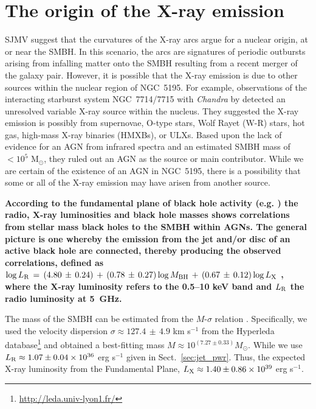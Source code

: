 \documentclass[fleqn,usenatbib]{mnras}
\def\sect{Sect.}
\begin{document}

\section{The origin of the X-ray emission}
\label{sec:xrays_orign}

SJMV suggest that the curvatures of the X-ray arcs argue for a nuclear origin, at or near the SMBH. In this 
scenario, the arcs are signatures of periodic outbursts arising from infalling matter onto the SMBH 
resulting from a recent merger of the galaxy pair. However, it is possible that the X-ray emission is due 
to other sources within the nuclear region of NGC~5195. 
For example, observations of the interacting starburst system NGC~7714/7715 with \textit{Chandra} by 
\cite{SSN2005} detected an unresolved variable X-ray source within the nucleus. They suggested the X-ray 
emission is possibly from supernovae, O-type stars, Wolf Rayet (W-R) stars,
hot gas, high-mass X-ray binaries (HMXBs), or ULXs. Based upon the lack of evidence for an AGN from 
infrared spectra and an estimated SMBH mass of $< 10^{5}$ M$_{\odot}$, they ruled out an AGN as the source 
or main contributor. While we are certain of the existence of an AGN in NGC~5195, there is a possibility 
that some or all of the X-ray emission may have arisen from another source. 

\textbf{According to the fundamental plane of black hole activity (e.g. \citealt{Merloni+2003,Falcke+2004,Kordingetal2006b}) the radio, X-ray luminosities and black hole masses shows correlations from stellar mass black holes to the SMBH within AGNs. The general picture is one whereby the emission from the jet and/or disc of an active black hole are connected, thereby producing the observed correlations, defined as $\log L_{\rm R}\,=\,(4.80\,\pm\,0.24)\,+\,(0.78\,\pm\,0.27)\log M_{\rm BH}\,+\,(0.67\,\pm\,0.12)\log L_{\rm X}$ \citep{Gultekinetal2009}, where the X-ray luminosity refers to the 0.5--10 keV band and $L_{\rm R}$ the radio luminosity at 5~GHz.}

The mass of the SMBH can be estimated from the $M$-$\sigma$ relation \citep{vandenBosch2016}. Specifically, we used the velocity dispersion $\sigma \approx 127.4\,\pm\,4.9$ km s$^{-1}$ from the Hyperleda database\footnote{\url{http://leda.univ-lyon1.fr/}} and obtained a best-fitting mass $M \approx 10^{(7.27\pm 0.33)} M_{\odot}$. While we use $L_{\rm R} \approx 1.07 \pm 0.04 \times 10^{36}$ erg s$^{-1}$ given in \sect~\ref{sec:jet_pwr}. Thus, the expected X-ray luminosity from the Fundamental Plane, $L_{\rm X} \approx 1.40 \pm 0.86 \times 10^{39}$ erg s$^{-1}$. 
\end{document}
